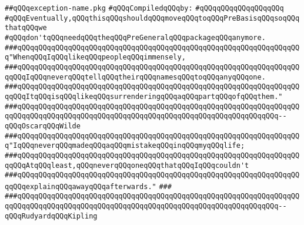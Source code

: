 \label{src/lib/std/src/exception-name.pkg}
\verb|##qQQqexception-name.pkg|\newline
\newline
\verb|#qQQqCompiledqQQqby:|\newline
\verb|#qQQqqQQqqQQqqQQqqQQq|\newline
\newline
\verb|#qQQqEventually,qQQqthisqQQqshouldqQQqmoveqQQqtoqQQqPreBasisqQQqsoqQQqthatqQQqwe|\newline
\verb|#qQQqdon'tqQQqneedqQQqtheqQQqPreGeneralqQQqpackageqQQqanymore.|\newline
\newline
\newline
\newline
\verb|###qQQqqQQqqQQqqQQqqQQqqQQqqQQqqQQqqQQqqQQqqQQqqQQqqQQqqQQqqQQqqQQqqQQq"WhenqQQqIqQQqlikeqQQqpeopleqQQqimmensely,|\newline
\verb|###qQQqqQQqqQQqqQQqqQQqqQQqqQQqqQQqqQQqqQQqqQQqqQQqqQQqqQQqqQQqqQQqqQQqqQQqIqQQqneverqQQqtellqQQqtheirqQQqnamesqQQqtoqQQqanyqQQqone.|\newline
\verb|###qQQqqQQqqQQqqQQqqQQqqQQqqQQqqQQqqQQqqQQqqQQqqQQqqQQqqQQqqQQqqQQqqQQqqQQqItqQQqisqQQqlikeqQQqsurrenderingqQQqaqQQqpartqQQqofqQQqthem."|\newline
\verb|###qQQqqQQqqQQqqQQqqQQqqQQqqQQqqQQqqQQqqQQqqQQqqQQqqQQqqQQqqQQqqQQqqQQqqQQqqQQqqQQqqQQqqQQqqQQqqQQqqQQqqQQqqQQqqQQqqQQqqQQqqQQqqQQqqQQq--qQQqOscarqQQqWilde|\newline
\newline
\newline
\newline
\verb|###qQQqqQQqqQQqqQQqqQQqqQQqqQQqqQQqqQQqqQQqqQQqqQQqqQQqqQQqqQQqqQQqqQQq"IqQQqneverqQQqmadeqQQqaqQQqmistakeqQQqinqQQqmyqQQqlife;|\newline
\verb|###qQQqqQQqqQQqqQQqqQQqqQQqqQQqqQQqqQQqqQQqqQQqqQQqqQQqqQQqqQQqqQQqqQQqqQQqAtqQQqleast,qQQqneverqQQqoneqQQqthatqQQqIqQQqcouldn't|\newline
\verb|###qQQqqQQqqQQqqQQqqQQqqQQqqQQqqQQqqQQqqQQqqQQqqQQqqQQqqQQqqQQqqQQqqQQqqQQqexplainqQQqawayqQQqafterwards."|\newline
\verb|###|\newline
\verb|###qQQqqQQqqQQqqQQqqQQqqQQqqQQqqQQqqQQqqQQqqQQqqQQqqQQqqQQqqQQqqQQqqQQqqQQqqQQqqQQqqQQqqQQqqQQqqQQqqQQqqQQqqQQqqQQqqQQqqQQqqQQqqQQqqQQq--qQQqRudyardqQQqKipling|\newline
\newline
